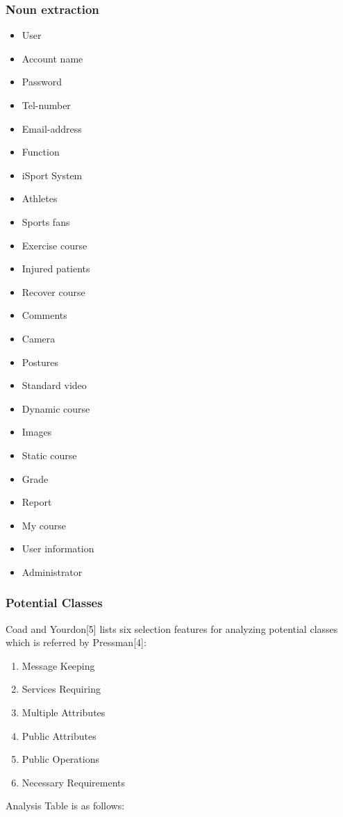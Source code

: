 \documentclass[16pt]{scrreprt}
\begin{document}
\subsubsection{Noun extraction}
\begin{itemize}
    \item User
    \item Account name
    \item Password
    \item Tel-number
    \item Email-address
    \item Function
    \item iSport System
    \item Athletes
    \item Sports fans
    \item Exercise course
    \item Injured patients
    \item Recover course
    \item Comments
    \item Camera
    \item Postures
    \item Standard video
    \item Dynamic course
    \item Images
    \item Static course
    \item Grade
    \item Report
    \item My course
    \item User information
    \item Administrator
\end{itemize}

\subsubsection{Potential Classes}
 Coad and Yourdon[5] lists six selection features for analyzing potential classes which is  referred by Pressman[4]:
 \begin{enumerate}
     \item Message Keeping
     \item Services Requiring
     \item Multiple Attributes
     \item Public Attributes
     \item Public Operations
     \item Necessary Requirements
 \end{enumerate}
 Analysis Table is as follows:
 
\end{document}
